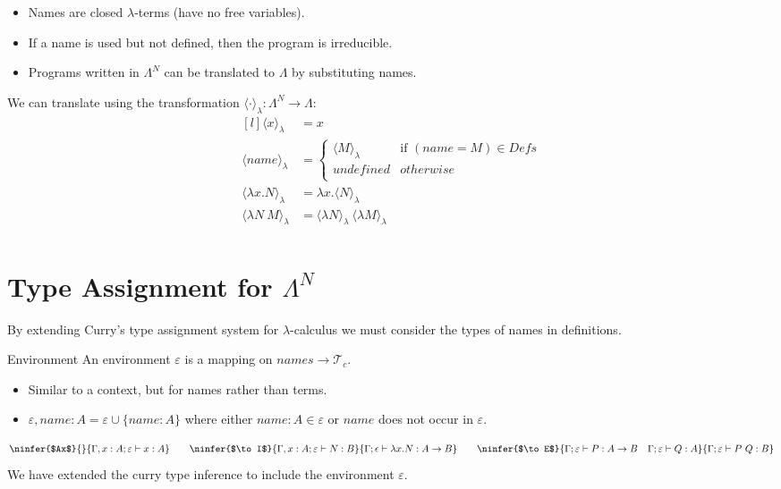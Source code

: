 \begin{itemize}
    \item Names are closed $\lambda$-terms (have no free variables).
    \item If a name is used but not defined, then the program is irreducible.
    \item Programs written in $\Lambda^N$ can be translated to $\Lambda$ by substituting names.
\end{itemize}
We can translate using the transformation $\langle \cdot \rangle_\lambda : \Lambda^N \to \Lambda$:
\[\begin{matrix*}[l]
    \langle x \rangle_\lambda & = x \\
    \langle name \rangle_\lambda & = \begin{cases}
        \langle M \rangle_\lambda & \text{if } (name = M) \in Defs \\
        undefined & otherwise \\
    \end{cases} \\
    \langle \lambda x . N \rangle_\lambda & = \lambda x . \langle N \rangle_\lambda \\
    \langle \lambda N \ M \rangle_\lambda & = \langle \lambda N \rangle_\lambda \ \langle \lambda M \rangle_\lambda \\
\end{matrix*}\]

\section{Type Assignment for $\Lambda^N$}
By extending Curry's type assignment system for $\lambda$-calculus we must consider the types of names in definitions.
\begin{definitionbox}{Environment}
    An environment $\varepsilon$ is a mapping on $names \to \mathcal{T}_c$.
    \begin{itemize}
        \item Similar to a context, but for names rather than terms.
        \item $\varepsilon, name:A = \varepsilon \cup \{ name: A \}$ where either $name : A \in \varepsilon$ or $name$ does not occur in $\varepsilon$.
    \end{itemize}
\end{definitionbox}

\[\ninfer{$Ax$}{}{\Gamma, x:A; \varepsilon \vdash x : A} 
\qquad \ninfer{$\to I$}{\Gamma, x:A ; \varepsilon \vdash N : B}{\Gamma ; \epsilon \vdash \lambda x . N : A \to B}
\qquad \ninfer{$\to E$}{\Gamma; \varepsilon \vdash P : A \to B \quad \Gamma ; \varepsilon \vdash Q : A}{\Gamma ; \varepsilon \vdash P \ Q : B}\]
We have extended the curry type inference to include the environment $\varepsilon$.

